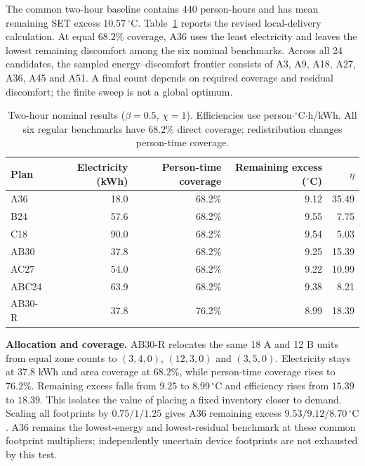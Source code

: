 The common two-hour baseline contains 440 person-hours and has mean remaining SET excess $10.57\,^{\circ}\mathrm C$. Table~\ref{tab:deployment-results} reports the revised local-delivery calculation. At equal $68.2\%$ coverage, A36 uses the least electricity and leaves the lowest remaining discomfort among the six nominal benchmarks. Across all 24 candidates, the sampled energy--discomfort frontier consists of A3, A9, A18, A27, A36, A45 and A51. A final count depends on required coverage and residual discomfort; the finite sweep is not a global optimum.

\begin{table}[!ht]
\centering\small
\caption{Two-hour nominal results ($\beta=0.5$, $\chi=1$). Efficiencies use person$\cdot{}^{\circ}$C$\cdot$h/kWh. All six regular benchmarks have $68.2\%$ direct coverage; redistribution changes person-time coverage.}
\label{tab:deployment-results}
\begin{tabular}{@{}lrrrr@{}}
\toprule
Plan & Electricity (kWh) & Person-time coverage & Remaining excess ($^{\circ}$C) & $\eta$\\
\midrule
A36 & 18.0 & 68.2\% & 9.12 & 35.49\\
B24 & 57.6 & 68.2\% & 9.55 & 7.75\\
C18 & 90.0 & 68.2\% & 9.54 & 5.03\\
AB30 & 37.8 & 68.2\% & 9.25 & 15.39\\
AC27 & 54.0 & 68.2\% & 9.22 & 10.99\\
ABC24 & 63.9 & 68.2\% & 9.38 & 8.21\\
AB30-R & 37.8 & 76.2\% & 8.99 & 18.39\\
\bottomrule
\end{tabular}
\end{table}

\noindent\textbf{Allocation and coverage.} AB30-R relocates the same 18 A and 12 B units from equal zone counts to $(3,4,0)$, $(12,3,0)$ and $(3,5,0)$. Electricity stays at 37.8 kWh and area coverage at $68.2\%$, while person-time coverage rises to $76.2\%$. Remaining excess falls from $9.25$ to $8.99\,^{\circ}\mathrm C$ and efficiency rises from $15.39$ to $18.39$. This isolates the value of placing a fixed inventory closer to demand. Scaling all footprints by $0.75/1/1.25$ gives A36 remaining excess $9.53/9.12/8.70\,^{\circ}\mathrm C$. A36 remains the lowest-energy and lowest-residual benchmark at these common footprint multipliers; independently uncertain device footprints are not exhausted by this test.

